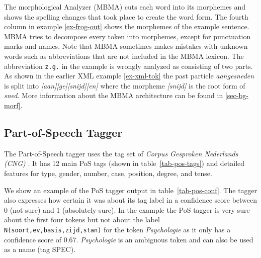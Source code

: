 \documentclass{book}
\begin{document}
The morphological Analyzer (MBMA) cuts each word into its morphemes and shows the spelling changes that took place to create the word form. The fourth column in example \ref{ex-frog-out} shows the morphemes of the example sentence. MBMA  tries to decompose every token into morphemes, except for punctuation marks and names. Note that MBMA sometimes makes mistakes with unknown words such as abbreviations that are not included in the MBMA lexicon. The abbreviation {\tt z.g.} in the example is wrongly analyzed as consisting of two parts.
As shown in the earlier XML example \ref{ex-xml-tok} the past particle {\it
aangesneden} is split into {\it[aan][ge][snijd][en]} where the morpheme {\it
[snijd]} is the root form of {\it sned}. More information about the MBMA
architecture can be found in \ref{sec-bg-morf}.


\subsection{Part-of-Speech Tagger}

The Part-of-Speech tagger uses the tag set of \emph{Corpus Gesproken Nederlands
(CNG)} \cite{vanEynde2004}. It has 12 main PoS tags (shown in table~\ref{tab-pos-tags})
and detailed features for type, gender, number, case, position, degree, and tense.

We show an example of the PoS tagger output in table~\ref{tab-pos-conf}. The tagger
also expresses how certain it was about its tag label in a confidence score
between 0 (not sure) and 1 (absolutely sure). In the example the PoS tagger is
very sure about the first four tokens but not about the label {\tt
N(soort,ev,basis,zijd,stan)} for the token {\it Psychologie} as it only has a
confidence score of 0.67. {\it Psychologie} is an ambiguous token and can also
be used as a name (tag SPEC).

\end{document}
